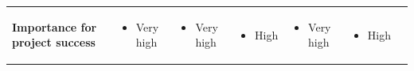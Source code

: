 \begin{table}
\begin{tabularx}{22cm}{X X X X X X r}
        \textbf{Importance for project success}  & 
        \begin{itemize} [noitemsep,topsep=0pt, leftmargin=0pt]
            \item Very high 
        \end{itemize} & 
        \begin{itemize} [noitemsep,topsep=0pt, leftmargin=0pt]
            \item Very high 
        \end{itemize} & 
        \begin{itemize} [noitemsep,topsep=0pt, leftmargin=0pt]
            \item High 
        \end{itemize} & 
        \begin{itemize} [noitemsep,topsep=0pt, leftmargin=0pt]
            \item Very high 
        \end{itemize} & 
        \begin{itemize} [noitemsep,topsep=0pt, leftmargin=0pt]
            \item High 
        \end{itemize} & 
         \\
        

\end{tabularx}
\end{table}
